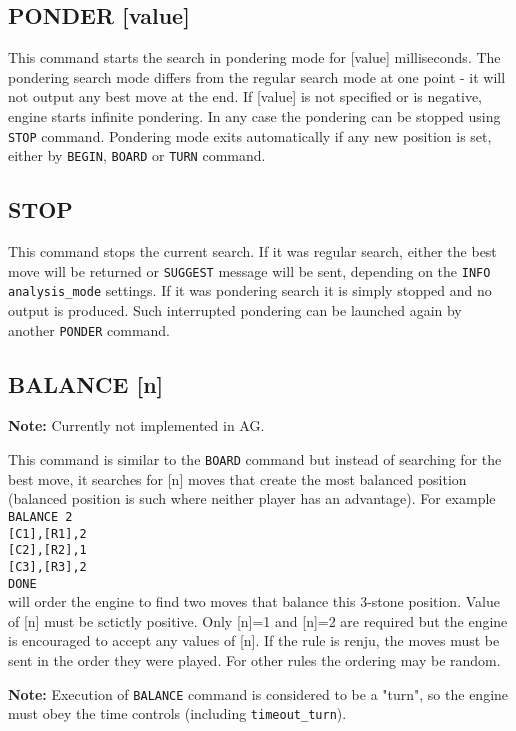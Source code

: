\documentclass[12pt,a4paper]{article}
\begin{document}
\subsection{PONDER [value]}
\label{cmd_ponder}
This command starts the search in pondering mode for [value] milliseconds. The pondering search mode differs from the regular search mode at one point - it will not output any best move at the end. If [value] is not specified or is negative, engine starts infinite pondering. In any case the pondering can be stopped using \texttt{STOP} command. Pondering mode exits automatically if any new position is set, either by \texttt{BEGIN}, \texttt{BOARD} or \texttt{TURN} command.


\subsection{STOP}
\label{cmd_stop}
This command stops the current search. If it was regular search, either the best move will be returned or \texttt{SUGGEST} message will be sent, depending on the \texttt{INFO analysis{\_}mode} settings. If it was pondering search it is simply stopped and no output is produced. Such interrupted pondering can be launched again by another \texttt{PONDER} command.


\subsection{BALANCE [n]}
\label{cmd_balance}
\textbf{Note:} Currently not implemented in AG.

This command is similar to the \texttt{BOARD} command but instead of searching for the best move, it searches for [n] moves that create the most balanced position (balanced position is such where neither player has an advantage). For example\\
\texttt{BALANCE 2} \\
\texttt{[C1],[R1],2} \\
\texttt{[C2],[R2],1} \\
\texttt{[C3],[R3],2} \\
\texttt{DONE}\\
will order the engine to find two moves that balance this 3-stone position. Value of [n] must be sctictly positive. Only [n]=1 and [n]=2 are required but the engine is encouraged to accept any values of [n]. If the rule is renju, the moves must be sent in the order they were played. For other rules the ordering may be random.

\textbf{Note:} Execution of \texttt{BALANCE} command is considered to be a "turn", so the engine must obey the time controls (including \texttt{timeout{\_}turn}).
\end{document}
